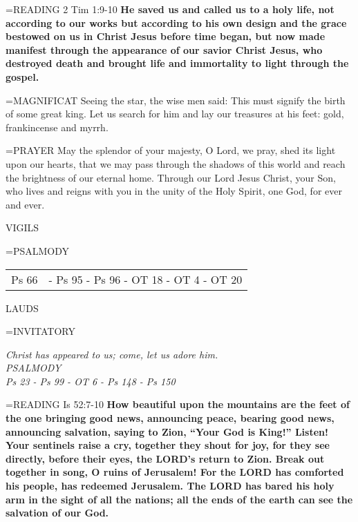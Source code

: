 \hangindent=\parindent \small{READING}    2 Tim 1:9-10 \textbf{   He saved us and called us to a holy life, not according to our works but according to his own design and the grace bestowed on us in Christ Jesus before time began, but now made manifest through the appearance of our savior Christ Jesus, who destroyed death and brought life and immortality to light through the gospel.\\}

\hangindent=\parindent \small{MAGNIFICAT 	Seeing the star, the wise men said: This must signify the birth of some great king. Let us search for him and lay our treasures at his feet: gold, frankincense and myrrh.\\}

\hangindent=\parindent \small{PRAYER 	May the splendor of your majesty, O Lord, we pray, shed its light upon our hearts, that we may pass through the shadows of this world and reach the brightness of our eternal home. Through our Lord Jesus Christ, your Son, who lives and reigns with you in the unity of the Holy  Spirit, one God, for ever and ever.}

\begin{flushleft}\normalsize VIGILS\\\end{flushleft}
\hangindent=\parindent \small{PSALMODY}
\begin{center}
\begin{tabular}{ l l }
Ps 66 &  - Ps 95 - Ps 96 - OT 18 - OT 4 - OT 20\\
\end{tabular}
\end{center}		

\begin{flushleft}\normalsize LAUDS\\\end{flushleft}
\hangindent=\parindent \small{INVITATORY}
\begin{center}
\textit{Christ has appeared to us; come, let us adore him.\\}
\textit{PSALMODY\\}
\textit{Ps 23 - Ps 99 - OT 6 - Ps 148 - Ps 150\\}
\end{center}

\hangindent=\parindent \small{READING}    Is 52:7-10 \textbf{    How beautiful upon the mountains are the feet of the one bringing good news, announcing peace, bearing good news, announcing salvation, saying to Zion, “Your God is King!” Listen! Your sentinels raise a cry, together they shout for joy, for they see directly, before their eyes, the LORD’s return to Zion. Break out together in song, O ruins of Jerusalem! For the LORD has comforted his people, has redeemed Jerusalem. The LORD has bared his holy arm in the sight of all the nations; all the ends of the earth can see the salvation of our God.\\}

